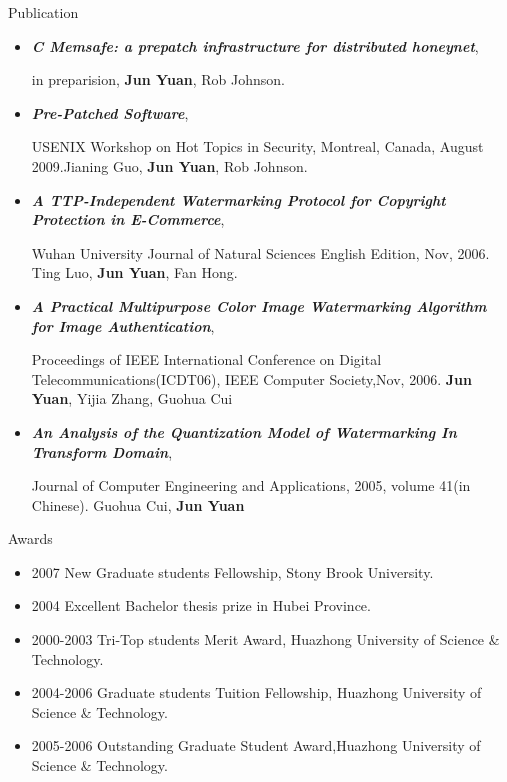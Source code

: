 \documentclass[11pt,oneside]{article}
\newenvironment{ressection}[1]{
	\vspace{4pt}
	{\fontfamily{phv}\selectfont\Large#1}
	\begin{itemize}
	\vspace{3pt}
}{
	\end{itemize}
}
\newcommand{\resitem}[1]{
	\vspace{-4pt}
	\item \begin{flushleft} #1 \end{flushleft}
}
\begin{document}
\begin{ressection}{Publication}
	\resitem{\textit{\textbf{C Memsafe: a prepatch infrastructure for distributed honeynet}}, \begin{small} in preparision, \textbf{Jun Yuan}, Rob Johnson.\end{small}}

	\resitem{\textit{\textbf{Pre-Patched Software}}, \begin{small}USENIX Workshop on Hot Topics in Security, Montreal, Canada, August 2009.Jianing Guo, \textbf{Jun Yuan}, Rob Johnson.\end{small}}

	\resitem{\textit{\textbf{A TTP-Independent Watermarking Protocol for Copyright Protection in E-Commerce}}, \begin{small}Wuhan University Journal of Natural Sciences English Edition, Nov, 2006. Ting Luo, \textbf{Jun Yuan}, Fan Hong.\end{small}
}

	\resitem{\textit{\textbf{A Practical Multipurpose Color Image Watermarking Algorithm for Image Authentication}}, \begin{small}Proceedings of IEEE International Conference on Digital Telecommunications(ICDT06), IEEE Computer Society,Nov, 2006. \textbf{Jun Yuan}, Yijia Zhang, Guohua Cui\end{small}
}

	\resitem{\textit{\textbf{An Analysis of the Quantization Model of Watermarking In Transform Domain}}, \begin{small}Journal of Computer Engineering and Applications, 2005, volume 41(in Chinese). Guohua Cui, \textbf{Jun Yuan}\end{small}
}

\end{ressection}



\begin{ressection}{Awards}
\resitem{\begin{small}2007 New Graduate students Fellowship, Stony Brook University.\end{small}}
\resitem{\begin{small}2004 Excellent Bachelor thesis prize in Hubei Province.\end{small}}
\resitem{\begin{small}2000-2003 Tri-Top students Merit Award, Huazhong University of Science \& Technology.\end{small}}
\resitem{\begin{small}2004-2006 Graduate students Tuition Fellowship, Huazhong University of Science \& Technology.\end{small}}
\resitem{\begin{small}2005-2006 Outstanding Graduate Student Award,Huazhong University of Science \& Technology.\end{small}}
\end{ressection}
\end{document}
